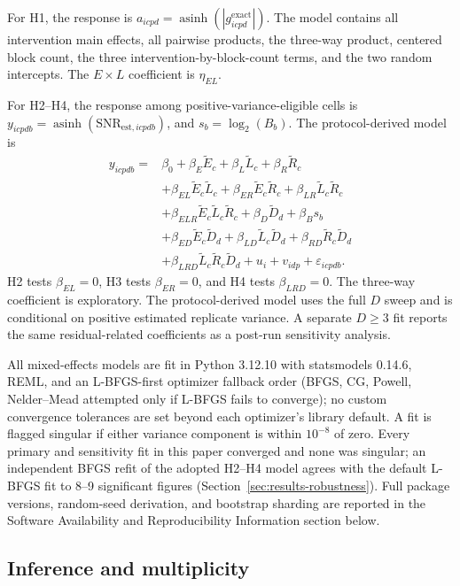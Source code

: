 \documentclass[pdflatex,sn-basic,Numbered]{sn-jnl}
\begin{document}
For H1, the response is $a_{icpd}=\operatorname{asinh}(|g^{\mathrm{exact}}_{icpd}|)$. The model contains all intervention main effects, all pairwise products, the three-way product, centered block count, the three intervention-by-block-count terms, and the two random intercepts. The $E\times L$ coefficient is $\eta_{EL}$.

For H2--H4, the response among positive-variance-eligible cells is $y_{icpdb}=\operatorname{asinh}(\mathrm{SNR}_{\mathrm{est},icpdb})$, and $s_b=\log_2(B_b)$. The protocol-derived model is
\begin{align*}
y_{icpdb}={}&\beta_0
+\beta_E\widetilde E_c
+\beta_L\widetilde L_c
+\beta_R\widetilde R_c\\
&+\beta_{EL}\widetilde E_c\widetilde L_c
+\beta_{ER}\widetilde E_c\widetilde R_c
+\beta_{LR}\widetilde L_c\widetilde R_c\\
&+\beta_{ELR}\widetilde E_c\widetilde L_c\widetilde R_c
+\beta_D\widetilde D_d+\beta_B s_b\\
&+\beta_{ED}\widetilde E_c\widetilde D_d
+\beta_{LD}\widetilde L_c\widetilde D_d
+\beta_{RD}\widetilde R_c\widetilde D_d\\
&+\beta_{LRD}\widetilde L_c\widetilde R_c\widetilde D_d
+u_i+v_{idp}+\varepsilon_{icpdb}.
\end{align*}
H2 tests $\beta_{EL}=0$, H3 tests $\beta_{ER}=0$, and H4 tests $\beta_{LRD}=0$. The three-way coefficient is exploratory. The protocol-derived model uses the full $D$ sweep and is conditional on positive estimated replicate variance. A separate $D\ge3$ fit reports the same residual-related coefficients as a post-run sensitivity analysis.

All mixed-effects models are fit in Python 3.12.10 with statsmodels 0.14.6, REML, and an L-BFGS-first optimizer fallback order (BFGS, CG, Powell, Nelder--Mead attempted only if L-BFGS fails to converge); no custom convergence tolerances are set beyond each optimizer's library default. A fit is flagged singular if either variance component is within $10^{-8}$ of zero. Every primary and sensitivity fit in this paper converged and none was singular; an independent BFGS refit of the adopted H2--H4 model agrees with the default L-BFGS fit to 8--9 significant figures (Section~\ref{sec:results-robustness}). Full package versions, random-seed derivation, and bootstrap sharding are reported in the Software Availability and Reproducibility Information section below.

\subsection{Inference and multiplicity}
\end{document}
